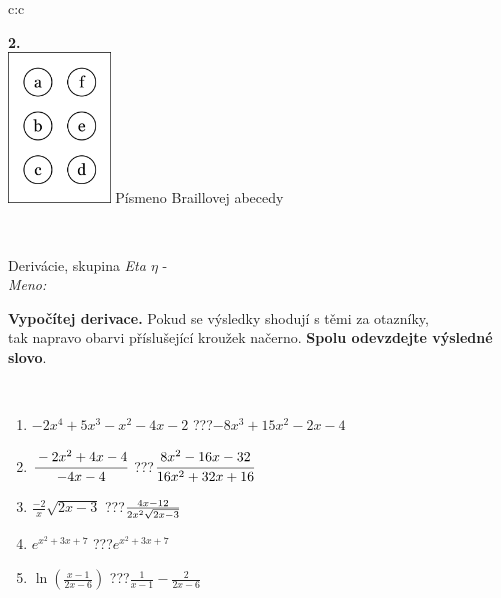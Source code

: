 \documentclass[10pt]{report}
\begin{document}
\begin{tabular}{c:c}
\begin{minipage}[c][104.5mm][t]{0.5\linewidth}
\begin{center}
\begin{minipage}{0.20\linewidth}
\begin{center}
{\Huge\bfseries 2.} \\[2mm]
\includegraphics[height=40mm]{../images/braille.png}
{\small Písmeno Braillovej abecedy}
\end{center}
\end{minipage}
\end{center}
\end{minipage}
\\ \hdashline
\begin{minipage}[c][104.5mm][t]{0.5\linewidth}
\begin{center}
\vspace{7mm}
{\huge Derivácie, skupina \textit{Eta $\eta$} -}\\[5mm]
\textit{Meno:}\phantom{xxxxxxxxxxxxxxxxxxxxxxxxxxxxxxxxxxxxxxxxxxxxxxxxxxxxxxxxxxxxxxxxx}\\[5mm]
\begin{minipage}{0.95\linewidth}
\begin{center}
\textbf{Vypočítej derivace.} Pokud se výsledky shodují s těmi za otazníky,\\tak napravo obarvi příslušející kroužek načerno. \textbf{Spolu odevzdejte výsledné slovo}.
\end{center}
\end{minipage}
\\[1mm]
\begin{minipage}{0.79\linewidth}
\begin{center}
\begin{varwidth}{\linewidth}
\begin{enumerate}
\normalsize
\item $-2x^4+5x^3-x^2-4x-2$\quad \dotfill\; ???\;\dotfill \quad $-8x^3+15x^2-2x-4$
\item $\cfrac{-2x^2+4x-4}{-4x-4}$\quad \dotfill\; ???\;\dotfill \quad $\cfrac{8x^2-16x-32}{16x^2+32x+16}$
\item $\frac{-2}{x}\sqrt{2x-3}$\quad \dotfill\; ???\;\dotfill \quad $\frac{4x-12}{2x^2 \sqrt{\smash[b]{2x-3}}}$
\item $e^{x^2+3x+7}$\quad \dotfill\; ???\;\dotfill \quad $e^{x^2+3x+7}$
\item $\ln{\left(\frac{x-1}{2x-6}\right)}$\quad \dotfill\; ???\;\dotfill \quad $\frac{1}{x-1}-\frac{2}{2x-6}$

\end{enumerate}
\end{varwidth}
\end{center}
\end{minipage}
\end{center}
\end{minipage}
\end{tabular}
\end{document}
